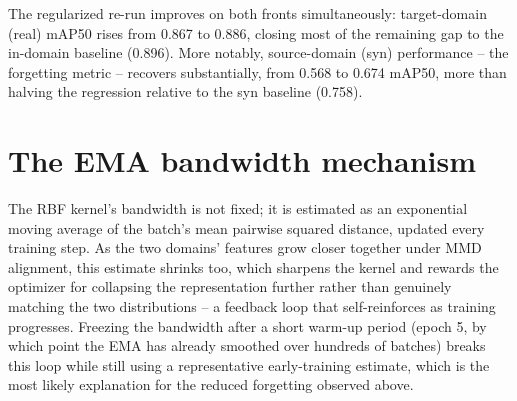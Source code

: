 \documentclass[11pt]{article}
\begin{document}
The regularized re-run improves on both fronts simultaneously: target-domain (real) mAP50 rises
from 0.867 to 0.886, closing most of the remaining gap to the in-domain baseline (0.896). More
notably, source-domain (syn) performance -- the forgetting metric -- recovers substantially,
from 0.568 to 0.674 mAP50, more than halving the regression relative to the syn baseline (0.758).

\section{The EMA bandwidth mechanism}

The RBF kernel's bandwidth is not fixed; it is estimated as an exponential moving average of the
batch's mean pairwise squared distance, updated every training step. As the two domains' features
grow closer together under MMD alignment, this estimate shrinks too, which sharpens the kernel
and rewards the optimizer for collapsing the representation further rather than genuinely
matching the two distributions -- a feedback loop that self-reinforces as training progresses.
Freezing the bandwidth after a short warm-up period (epoch 5, by which point the EMA has already
smoothed over hundreds of batches) breaks this loop while still using a representative early-training
estimate, which is the most likely explanation for the reduced forgetting observed above.
\end{document}
